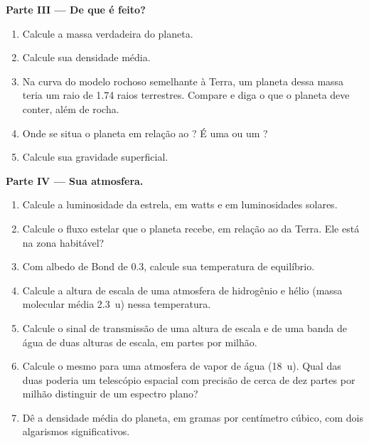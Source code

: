 \begin{problem}
\medskip\noindent\textbf{Parte III --- De que é feito?}
\begin{enumerate}[resume]
\item Calcule a massa verdadeira do planeta.
\item Calcule sua densidade média.
\item Na curva do modelo rochoso semelhante à Terra, um planeta dessa massa teria
  um raio de 1.74 raios terrestres. Compare e diga o que o planeta
  deve conter, além de rocha.
\item Onde se situa o planeta em relação ao ? É
  uma  ou um ?
\item Calcule sua gravidade superficial.
\end{enumerate}

\medskip\noindent\textbf{Parte IV --- Sua atmosfera.}
\begin{enumerate}[resume]
\item Calcule a luminosidade da estrela, em watts e em luminosidades
  solares.
\item Calcule o fluxo estelar que o planeta recebe, em relação ao da
  Terra. Ele está na zona habitável?
\item Com albedo de Bond de 0.3, calcule sua temperatura de equilíbrio.
\item Calcule a altura de escala de uma atmosfera de hidrogênio e hélio
  (massa molecular média \qty{2.3}{u}) nessa temperatura.
\item Calcule o sinal de transmissão de uma altura de escala e de uma
  banda de água de duas alturas de escala, em partes por milhão.
\item Calcule o mesmo para uma atmosfera de vapor de água (\qty{18}{u}). Qual das duas
  poderia um telescópio espacial com precisão de cerca de dez partes por
  milhão distinguir de um espectro plano?
\item Dê a densidade média do planeta, em gramas por centímetro cúbico, com
  dois algarismos significativos.
\end{enumerate}
\end{problem}
